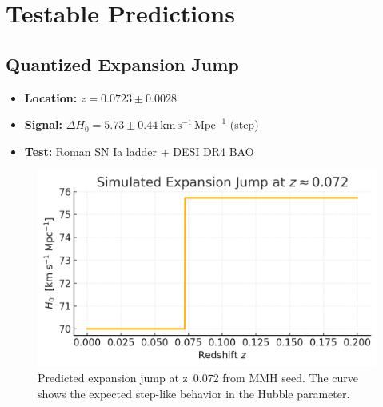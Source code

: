 \documentclass[11pt,a4paper]{article}
\begin{document}
\FloatBarrier
\section{Testable Predictions}

\subsection{Quantized Expansion Jump}
\begin{itemize}
  \item \textbf{Location:} $z = 0.0723 \pm 0.0028$
  \item \textbf{Signal:} $\Delta H_0 = 5.73 \pm 0.44~\mathrm{km\,s^{-1}\,\mathrm{Mpc}^{-1}}$ (step)
  \item \textbf{Test:} Roman SN Ia ladder + DESI DR4 BAO
\end{itemize}
\FloatBarrier
\begin{figure}[htbp]
  \centering
  \includegraphics[width=0.75\linewidth]{figs/phase_flip.png}
  \caption{Predicted expansion jump at z~0.072 from MMH seed. The curve shows the expected step-like behavior in the Hubble parameter.}
  \label{fig:expansion_jump}
\end{figure}
\FloatBarrier
\end{document}
